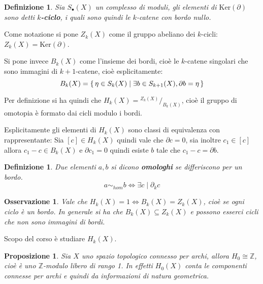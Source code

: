 \documentclass[10pt, twoside=false, x11names]{scrbook}
\newtheorem{proposition}[theorem]{Proposizione}
\newtheorem{osservation}[theorem]{Osservazione}
\newtheorem{definition}[theorem]{Definizione}
\newcommand{\Z}{\mathbb{Z}}
\renewcommand{\ker}[1]{\mathrm{Ker}( #1)}
\newcommand*\quot[2]{{^{\textstyle #1}\big/_{\textstyle #2}}}
\begin{document}
\begin{definition}
  Sia $ S_\bullet(X) $ un complesso di moduli, gli elementi di $ \ker{\partial} $ sono detti
  \textbf{$ k $-ciclo},  i quali sono quindi le $ k $-catene
  con bordo nullo.
\end{definition}

Come notazione si pone $ Z_k(X) $ come il gruppo abeliano dei $ k $-cicli: $ Z_k(X)
= \ker{\partial} $.

Si pone invece $ B_k(X) $ come l'insieme dei bordi, cioè le $ k $-catene singolari
che sono immagini di $ k+1 $-catene, cioè esplicitamente:
\[
  B_k(X) = \set{\eta \in S_k(X) | \exists b \in S_{k+1}(X), \partial b = \eta}
\]

Per definizione si ha quindi che $ H_k(X) = \quot{Z_k(X)}{B_k(X)} $, cioè il gruppo
di omotopia è formato dai cicli modulo i bordi.

Esplicitamente gli elementi di $ H_k(X) $ sono classi di equivalenza con rappresentante:
Sia $ [c] \in H_k(X) $ quindi vale che $ \partial c = 0 $, sia inoltre $ c_1 \in [c] $ allora
$ c_1 - c \in B_k(X) $ e $ \partial c_1 = 0 $ quindi esiste $ b $ tale che $ c_1 - c = \partial b $.

\begin{definition}
  Due elementi $ a,b $ si dicono \textbf{omologhi}  se differiscono per un bordo.
  \[
    a \sim_{hom} b \Leftrightarrow \exists c \; | \; \partial_k c
  \]
\end{definition}

\begin{osservation}
  Vale che $  H_k(X) = 1 \Leftrightarrow B_k(X) = Z_k(X) $, cioè se ogni ciclo è un bordo. In generale si ha che $ B_k(X) \subseteq Z_k(X) $
  e possono esserci cicli che non sono immagini di bordi.
\end{osservation}

Scopo del corso è studiare $ H_k(X) $.

\begin{proposition}
  Sia $ X $ uno spazio topologico connesso per archi, allora $ H_0 \cong \Z $, cioè è uno $ \Z $-modulo libero di rango 1.
  In effetti $ H_0(X) $ \emph{conta} le componenti connesse per archi e quindi da informazioni di natura geometrica.
\end{proposition}
\end{document}

